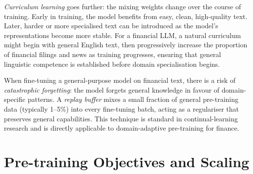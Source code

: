 \begin{context}
\emph{Curriculum learning} goes further: the mixing weights change over the
course of training.  Early in training, the model benefits from easy, clean,
high-quality text.  Later, harder or more specialised text can be introduced
as the model's representations become more stable.  For a financial LLM,
a natural curriculum might begin with general English text, then progressively
increase the proportion of financial filings and news as training progresses,
ensuring that general linguistic competence is established before domain
specialisation begins.

\begin{remark}
\label{rem:replay}
When fine-tuning a general-purpose model on financial text, there is a risk of
\emph{catastrophic forgetting}: the model forgets general knowledge in favour of
domain-specific patterns.  A \emph{replay buffer} mixes a small fraction of
general pre-training data (typically 1--5\%) into every fine-tuning batch,
acting as a regulariser that preserves general capabilities.  This technique
is standard in continual-learning research and is directly applicable to
domain-adaptive pre-training for finance.
\end{remark}

\end{context}


\section{Pre-training Objectives and Scaling}
\label{sec:pretraining}

